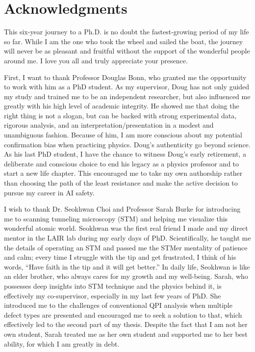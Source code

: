 
\chapter{Acknowledgments}

This six-year journey to a Ph.D. is no doubt the fastest-growing period of my life so far. While I am the one who took the wheel and sailed the boat, the journey will never be as pleasant and fruitful without the support of the wonderful people around me. I love you all and truly appreciate your presence. 

First, I want to thank Professor Douglas Bonn, who granted me the opportunity to work with him as a PhD student. As my supervisor, Doug has not only guided my study and trained me to be an independent researcher, but also influenced me greatly with his high level of academic integrity. He showed me that doing the right thing is not a slogan, but can be backed with strong experimental data, rigorous analysis, and an interpretation/presentation in a modest and unambiguous fashion.  Because of him, I am more conscious about my potential confirmation bias when practicing physics. Doug’s authenticity go beyond science. As his last PhD student, I have the chance to witness Doug’s early retirement, a deliberate and conscious choice to end his legacy as a physics professor and to start a new life chapter. This encouraged me to take my own authorship rather than choosing the path of the least resistance and make the active decision to pursue my career in AI safety. 

I wish to thank Dr. Seokhwan Choi and Professor Sarah Burke for introducing me to scanning tunneling microscopy (STM) and helping me visualize this wonderful atomic world. Seokhwan was the first real friend I made and my direct mentor in the LAIR lab during my early days of PhD. Scientifically, he taught me the details of operating an STM and passed me the STMer mentality of patience and calm; every time I struggle with the tip and get frustrated, I think of his words, “Have faith in the tip and it will get better.” In daily life, Seokhwan is like an elder brother, who always cares for my growth and my well-being. Sarah, who possesses deep insights into STM technique and the physics behind it, is effectively my co-supervisor, especially in my last few years of PhD. She introduced me to the challenges of conventional QPI analysis when multiple defect types are presented and encouraged me to seek a solution to that, which effectively led to the second part of my thesis. Despite the fact that I am not her own student, Sarah treated me as her own student and supported me to her best ability, for which I am greatly in debt. 

